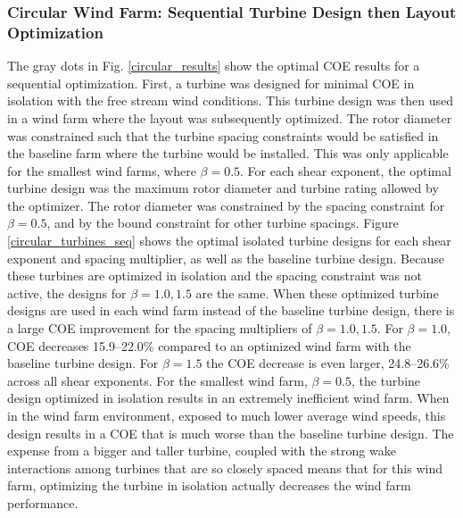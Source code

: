 \subsubsection{Circular Wind Farm: Sequential Turbine Design then Layout Optimization}
The gray dots in Fig. \ref{circular_results} show the optimal COE results for a sequential optimization. First, a turbine was designed for minimal COE in isolation with the free stream wind conditions. This turbine design was then used in a wind farm where the layout was subsequently optimized. 
The rotor diameter was constrained such that the turbine spacing constraints would be satisfied in the baseline farm where the turbine would be installed. This was only applicable for the smallest wind farms, where $\beta=0.5$. 
For each shear exponent, the optimal turbine design was the maximum rotor diameter and turbine rating allowed by the optimizer. The rotor diameter was constrained by the spacing constraint for $\beta=0.5$, and by the bound constraint for other turbine spacings.
Figure \ref{circular_turbines_seq} shows the optimal isolated turbine designs for each shear exponent and spacing multiplier, as well as the baseline turbine design. Because these turbines are optimized in isolation and the spacing constraint was not active, the designs for $\beta=1.0,1.5$ are the same. 
When these optimized turbine designs are used in each wind farm instead of the baseline turbine design, there is a large COE improvement for the spacing multipliers of $\beta=1.0, 1.5$. For $\beta=1.0$, COE decreases 15.9--22.0\% compared to an optimized wind farm with the baseline turbine design. For $\beta=1.5$ the COE decrease is even larger, 24.8--26.6\% across all shear exponents. 
For the smallest wind farm, $\beta=0.5$, the turbine design optimized in isolation results in an extremely inefficient wind farm. When in the wind farm environment, exposed to much lower average wind speeds, this design results in a COE that is much worse than the baseline turbine design. The expense from a bigger and taller turbine, coupled with the strong wake interactions among turbines that are so closely spaced means that for this wind farm, optimizing the turbine in isolation actually decreases the wind farm performance. 


